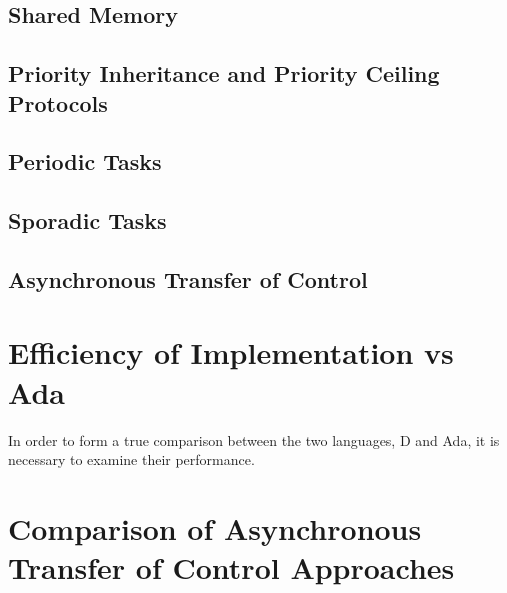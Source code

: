 \subsection{Shared Memory}

\subsection{Priority Inheritance and Priority Ceiling Protocols}

\subsection{Periodic Tasks}

\subsection{Sporadic Tasks}

\subsection{Asynchronous Transfer of Control}

\section{Efficiency of Implementation vs Ada}
In order to form a true comparison between the two languages, D and Ada, it is
necessary to examine their performance.

\section{Comparison of Asynchronous Transfer of Control Approaches}
